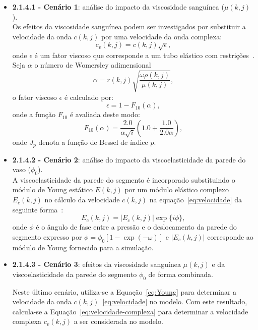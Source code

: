 \begin{itemize}
	\item \textbf{2.1.4.1 - Cenário 1}: análise do impacto da viscosidade sanguínea ($\mu(k,j)$).\\
	Os efeitos da viscosidade sanguínea podem ser investigados por substituir a velocidade
	da onda $c(k,j)$ por uma velocidade da onda complexa:
	\begin{equation} 
		c_v(k,j) = c(k,j) \sqrt{\epsilon},\label{eq:velocidade-complexa}
	\end{equation}
	onde $\epsilon$ é um fator viscoso que corresponde a um tubo elástico com restrições~\cite{Duan1992}. Seja $\alpha$ o
	número de Womersley adimensional
	\begin{equation}
		\alpha = r(k,j) \sqrt{\frac{\omega \rho(k,j)}{\mu(k,j)}},
	\end{equation}
	o fator viscoso $\epsilon$ é calculado por:
	\begin{equation}
		\epsilon = 1 - F_{10} (\alpha),
	\end{equation}
	onde a função $F_{10}$ é avaliada deste modo:
	\begin{equation}
		F_{10} (\alpha) = \frac{2.0}{\alpha \sqrt{i}}(1.0+\frac{1.0}{2.0\alpha}),
	\end{equation}
	onde $J_p$ denota a função de Bessel de índice $p$.
	
	\item \textbf{2.1.4.2 - Cenário 2}: análise do impacto da viscoelasticidade da parede do vaso ($\phi_0$).\\
	A viscoelasticidade da parede do segmento é incorporado substituindo o módulo de Young
	estático $E(k,j)$ por um módulo elástico complexo $E_c(k,j)$ no cálculo da velocidade $c(k,j)$ na equação~\eqref{eq:velocidade}
	da seguinte forma~\cite{Duan}:
	\begin{equation}
		E_c(k,j) = |E_c(k,j)| \exp\{i\phi\},\label{eq:Young}
	\end{equation}
	onde $\phi$ é o ângulo de fase entre a pressão e o deslocamento da parede do segmento \cite{Taylor3} expresso por $\phi = \phi_0 [1-\exp(-\omega)]$ e $|E_c (k,j)|$ corresponde ao módulo de Young fornecido para a simulação.
	
	\item \textbf{2.1.4.3 - Cenário 3}: efeitos da viscosidade sanguínea $\mu(k,j)$ e da viscoelasticidade da parede do segmento $\phi_0$ de forma combinada.
	
	Neste último cenário, utiliza-se a Equação~\eqref{eq:Young} para determinar a velocidade da onda $c(k,j)$~\eqref{eq:velocidade} no modelo. Com este resultado, calcula-se  a Equação~\eqref{eq:velocidade-complexa} para determinar a velocidade complexa $c_v(k,j)$ a ser considerada no modelo.
\end{itemize}

